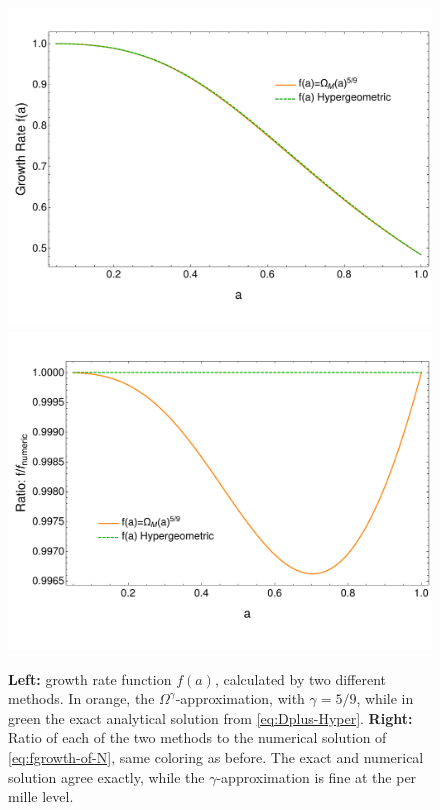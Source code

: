 \begin{figure}[tbph]
	\includegraphics[width=0.47\linewidth]{Figures/fGrowthRate-ofa-Approx-vs-ExactHyper}
	\includegraphics[width=0.47\linewidth]{Figures/fGrowthRate-Ratio-ofa-Approx-vs-ExactHyper-RatioToNumeric}
	\caption[Growth rate comparison for CDM]{
	\textbf{Left:} growth rate function $f(a)$, calculated by two different methods. In orange, the $\Omega^\gamma$-approximation, with $\gamma=5/9$, while
	in green the exact analytical solution from \cref{eq:Dplus-Hyper}.
    \textbf{Right:} Ratio of each of the two methods to the numerical solution of \cref{eq:fgrowth-of-N}, same coloring as before. The exact and numerical solution
agree exactly, while the $\gamma$-approximation is fine at the per mille level.}
	\label{fig:fgrowthrate-ofa-approx-vs-exacthyper}
\end{figure}



